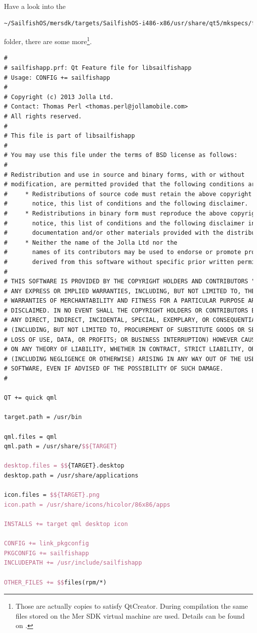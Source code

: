 Have a look into the
%
\begin{lstlisting}[language=tex]
~/SailfishOS/mersdk/targets/SailfishOS-i486-x86/usr/share/qt5/mkspecs/features/
\end{lstlisting}
%
folder, there are some more\footnote{Those are actually copies to satisfy QtCreator. During compilation the same files stored on the Mer SDK virtual machine are used. Details can be found on \cite{sailfishos6}.}.
%
\begin{lstlisting}[language=tex]
#
# sailfishapp.prf: Qt Feature file for libsailfishapp
# Usage: CONFIG += sailfishapp
#
# Copyright (c) 2013 Jolla Ltd.
# Contact: Thomas Perl <thomas.perl@jollamobile.com>
# All rights reserved.
#
# This file is part of libsailfishapp
#
# You may use this file under the terms of BSD license as follows:
#
# Redistribution and use in source and binary forms, with or without
# modification, are permitted provided that the following conditions are met:
#     * Redistributions of source code must retain the above copyright
#       notice, this list of conditions and the following disclaimer.
#     * Redistributions in binary form must reproduce the above copyright
#       notice, this list of conditions and the following disclaimer in the
#       documentation and/or other materials provided with the distribution.
#     * Neither the name of the Jolla Ltd nor the
#       names of its contributors may be used to endorse or promote products
#       derived from this software without specific prior written permission.
#
# THIS SOFTWARE IS PROVIDED BY THE COPYRIGHT HOLDERS AND CONTRIBUTORS "AS IS" AND
# ANY EXPRESS OR IMPLIED WARRANTIES, INCLUDING, BUT NOT LIMITED TO, THE IMPLIED
# WARRANTIES OF MERCHANTABILITY AND FITNESS FOR A PARTICULAR PURPOSE ARE
# DISCLAIMED. IN NO EVENT SHALL THE COPYRIGHT HOLDERS OR CONTRIBUTORS BE LIABLE FOR
# ANY DIRECT, INDIRECT, INCIDENTAL, SPECIAL, EXEMPLARY, OR CONSEQUENTIAL DAMAGES
# (INCLUDING, BUT NOT LIMITED TO, PROCUREMENT OF SUBSTITUTE GOODS OR SERVICES;
# LOSS OF USE, DATA, OR PROFITS; OR BUSINESS INTERRUPTION) HOWEVER CAUSED AND
# ON ANY THEORY OF LIABILITY, WHETHER IN CONTRACT, STRICT LIABILITY, OR TORT
# (INCLUDING NEGLIGENCE OR OTHERWISE) ARISING IN ANY WAY OUT OF THE USE OF THIS
# SOFTWARE, EVEN IF ADVISED OF THE POSSIBILITY OF SUCH DAMAGE.
#

QT += quick qml

target.path = /usr/bin

qml.files = qml
qml.path = /usr/share/$${TARGET}

desktop.files = $${TARGET}.desktop
desktop.path = /usr/share/applications

icon.files = $${TARGET}.png
icon.path = /usr/share/icons/hicolor/86x86/apps

INSTALLS += target qml desktop icon

CONFIG += link_pkgconfig
PKGCONFIG += sailfishapp
INCLUDEPATH += /usr/include/sailfishapp

OTHER_FILES += $$files(rpm/*)
\end{lstlisting}
